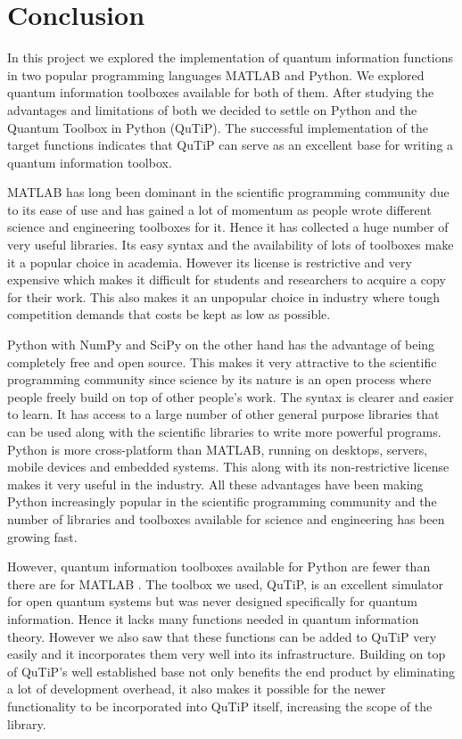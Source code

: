 \chapter{Conclusion}

In this project we explored the implementation of quantum information functions in two popular programming languages MATLAB and Python. We explored quantum information toolboxes available for both of them. After studying the advantages and limitations of both we decided to settle on Python and the Quantum Toolbox in Python (QuTiP). The successful implementation of the target functions indicates that QuTiP can serve as an excellent base for writing a quantum information toolbox.
\par MATLAB has long been dominant in the scientific programming community due to its ease of use and has gained a lot of momentum as people wrote different science and engineering toolboxes for it. Hence it has collected a huge number of very useful libraries. Its easy syntax and the availability of lots of toolboxes make it a popular choice in academia. However its license is restrictive and very expensive which makes it difficult for students and researchers to acquire a copy for their work. This also makes it an unpopular choice in industry where tough competition demands that costs be kept as low as possible.
\par Python with NumPy and SciPy on the other hand has the advantage of being completely free and open source. This makes it very attractive to the scientific programming community since science by its nature is an open process where people freely build on top of other people's work. The syntax is clearer and easier to learn. It has access to a large number of other general purpose libraries that can be used along with the scientific libraries to write more powerful programs. Python is more cross-platform than MATLAB, running on desktops, servers, mobile devices and embedded systems. This along with its non-restrictive license makes it very useful in the industry. All these advantages have been making Python increasingly popular in the scientific programming community and the number of libraries and toolboxes available for science and engineering has been growing fast.
\par However, quantum information toolboxes available for Python are fewer than there are for MATLAB \cite{quantikiqcsimulators}. The toolbox we used, QuTiP, is an excellent simulator for open quantum systems but was never designed specifically for quantum information. Hence it lacks many functions needed in quantum information theory. However we also saw that these functions can be added to QuTiP very easily and it incorporates them very well into its infrastructure. Building on top of QuTiP's well established base not only benefits the end product by eliminating a lot of development overhead, it also makes it possible for the newer functionality to be incorporated into QuTiP itself, increasing the scope of the library.
